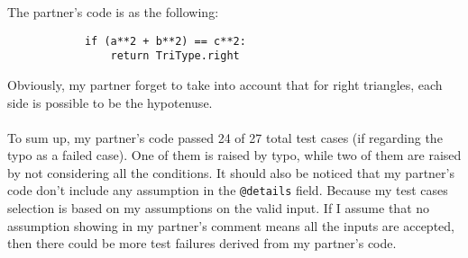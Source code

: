\documentclass[12pt]{article}
\begin{document}
The partner's code is as the following:
\begin{lstlisting}
            if (a**2 + b**2) == c**2:
                return TriType.right
\end{lstlisting}
Obviously, my partner forget to take into account that for right triangles, each side is possible to be the hypotenuse.\\\\
To sum up, my partner's code passed 24 of 27 total test cases (if regarding the typo as a failed case). One of them is raised by typo, while two of them are raised by not considering all the conditions.
It should also be noticed that my partner's code don't include any assumption in the \verb|@details| field. Because my test cases selection is based on my assumptions on the valid input. If I assume that no assumption showing in my partner's comment means all the inputs are accepted, then there could be more test failures derived from my partner's code.
\end{document}
